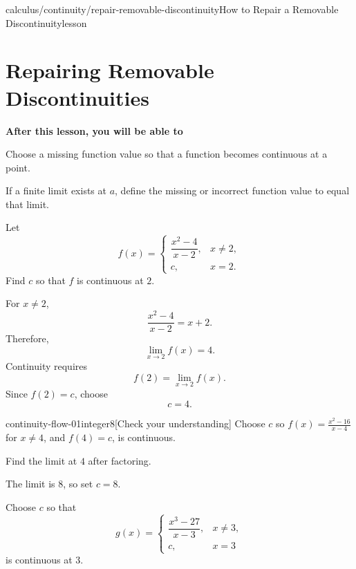 \documentclass[11pt,openany]{book}
\theoremstyle{bgplain}
\newcounter{bgexample}[chapter]
\newcounter{bgcheck}[section]
\newcommand{\lessonobjective}[1]{%
  \par\Needspace{4\baselineskip}\addvspace{0.6em}%
  {\bfseries\color{BGInk}After this lesson, you will be able to}\par\smallskip
  #1\par\addvspace{0.5em}%
}
\begin{document}
\begin{webpage}{calculus/continuity/repair-removable-discontinuity}{How to Repair a Removable Discontinuity}{lesson}
\section{Repairing Removable Discontinuities}

\lessonobjective{
Choose a missing function value so that a function becomes continuous at a point.
}

If a finite limit exists at \(a\), define the missing or incorrect function value to equal that limit.

\begin{bgguided}[title={Fill the hole with the approached value}]
Let
\[
  f(x)=
  \begin{cases}
    \dfrac{x^2-4}{x-2},&x\ne2,\\
    c,&x=2.
  \end{cases}
\]
Find \(c\) so that \(f\) is continuous at \(2\).

\begin{bgsolution}
For \(x\ne2\),
\[
  \frac{x^2-4}{x-2}=x+2.
\]
Therefore,
\[
  \lim_{x\to2}f(x)=4.
\]
Continuity requires
\[
  f(2)=\lim_{x\to2}f(x).
\]
Since \(f(2)=c\), choose
\[
  \boxed{c=4}.
\]
\end{bgsolution}
\end{bgguided}


\begin{bgcheck}{continuity-flow-01}{integer}{8}[Check your understanding]
Choose \(c\) so \(f(x)=\frac{x^2-16}{x-4}\) for \(x\ne4\), and \(f(4)=c\), is continuous.
\begin{bghint}
Find the limit at \(4\) after factoring.
\end{bghint}
\begin{bgreveal}
The limit is \(8\), so set \(c=8\).
\end{bgreveal}
\end{bgcheck}



\begin{bgexample}[title={Repair a more complicated hole}]
Choose \(c\) so that
\[
  g(x)=
  \begin{cases}
    \dfrac{x^3-27}{x-3},&x\ne3,\\
    c,&x=3
  \end{cases}
\]
is continuous at \(3\).


\end{bgexample}
\end{webpage}
\end{document}
